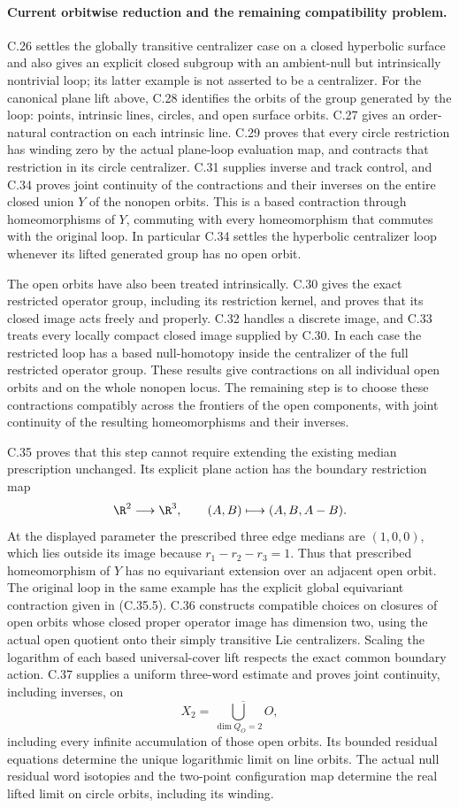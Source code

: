 \paragraph{Current orbitwise reduction and the remaining compatibility problem.}
C.26 settles the globally transitive centralizer case on a closed
hyperbolic surface and also gives an explicit closed subgroup with an
ambient-null but intrinsically nontrivial loop; its latter example is
not asserted to be a centralizer. For the canonical plane lift above,
C.28 identifies the orbits of the group generated by the loop:
points, intrinsic lines, circles, and open surface orbits.
C.27 gives an order-natural contraction on each intrinsic line.
C.29 proves that every circle restriction has winding zero by the
actual plane-loop evaluation map, and contracts that restriction
in its circle centralizer.
C.31 supplies inverse and track control, and C.34 proves joint
continuity of the contractions and their inverses on the entire
closed union $Y$ of the nonopen orbits. This is a based contraction
through homeomorphisms of $Y$, commuting with every homeomorphism
that commutes with the original loop. In particular C.34 settles
the hyperbolic centralizer loop whenever its lifted generated
group has no open orbit.

The open orbits have also been treated intrinsically. C.30 gives
the exact restricted operator group, including its restriction
kernel, and proves that its closed image acts freely and properly.
C.32 handles a discrete image, and C.33 treats every locally
compact closed image supplied by C.30. In each case the restricted
loop has a based null-homotopy inside the centralizer of the full
restricted operator group. These results give contractions on
all individual open orbits and on the whole nonopen locus.
The remaining step is to choose these contractions compatibly
across the frontiers of the open components, with joint
continuity of the resulting homeomorphisms and their inverses.

C.35 proves that this step cannot require extending the existing
median prescription unchanged. Its explicit plane action has
the boundary restriction map
\[
 \R^2\longrightarrow\R^3,\qquad
                  (A,B)\longmapsto(A,B,A-B).
\]
At the displayed parameter the prescribed three edge medians
are $(1,0,0)$, which lies outside its image because
$r_1-r_2-r_3=1$. Thus that prescribed homeomorphism of $Y$
has no equivariant extension over an adjacent open orbit.
The original loop in the same example has the explicit global
equivariant contraction given in (C.35.5).
C.36 constructs compatible choices on closures of open orbits
whose closed proper operator image has dimension two, using the
actual open quotient onto their simply transitive Lie
centralizers. Scaling the logarithm of each based universal-cover
lift respects the exact common boundary action. C.37 supplies a
uniform three-word estimate and proves joint continuity, including
inverses, on
\[
 X_2=\overline{\bigcup_{\dim Q_O=2}O},
\]
including every infinite accumulation of those open orbits.
Its bounded residual equations determine the unique logarithmic
limit on line orbits. The actual null residual word isotopies
and the two-point configuration map determine the real lifted
limit on circle orbits, including its winding.

